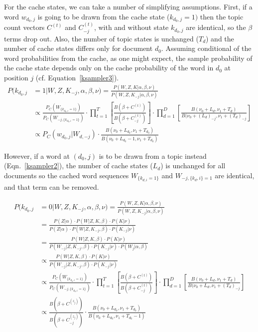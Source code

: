 For the cache states, we can take a number of simplifying assumptions.  First, if a word $w_{d_0,j}$ is going to be drawn from the cache state ($k_{d_0,j}=1)$ then the topic count vectors $C^{(t)}$ and $C^{(t)}_{-j}$, with and without state $k_{d_0,j}$ are identical, so the $\beta$ terms drop out. Also, the number of topic states is unchanged ($T_d$) and the number of cache states differs only for document $d_0$.   Assuming conditional of the word probabilities from the cache, as one might expect, the sample probability of the cache state depends only on the cache probability of the word in $d_0$ at position $j$ (cf. Equation~\ref{ksampler3}).
\begin{align}
P(k_{d_0,j}&=1|W,Z,K_{-j},\alpha,\beta,\nu) = \frac{P(W,Z,K|\alpha,\beta,\nu)}{P(W,Z,K_{-j}|\alpha,\beta,\nu)} \\
&\propto \frac{P_C(W_{\{k_{d_0,i}=1\}})}{P_C(W_{-j,\{k_{d_0,i}=1\}}) } \cdot \prod_{t=1}^T \left [ \frac{B(\beta + C^{(t)})}{B(\beta + C^{(t)}_{-j}) } \right ] \cdot \prod_{d=1}^{D} \left [ \frac{B(\nu_0+L_d,\nu_1+T_d)}{B(\nu_0+(L_d)_{-j},\nu_1+ (T_d)_{-j}} \right ]  \\
&\propto P_C(w_{d_0,j}|W_{d,-j})\cdot \frac{B(\nu_0+L_{d_0},\nu_1+T_{d_0})}{B(\nu_0+L_{d_0} - 1,\nu_1+T_{d_0})}  \label{ksampler3}
\end{align}

However, if a word at ${(d_0,j)}$ is to be drawn from a topic instead (Eqn.~\ref{ksampler2}), the number of cache states ($L_d$) is unchanged for all documents so the cached word sequences $W_{\{k_{d,i}=1\}}$ and $W_{-j,\{k_d,i\}=1}$ are identical, and that term can be removed.  

\begin{align}
P(k_{d_0,j}&=0|W,Z,K_{-j},\alpha,\beta,\nu) = \frac{P(W,Z,K|\alpha,\beta,\nu)}{P(W,Z,K_{-j}|\alpha,\beta,\nu)} \label{ksampler2} \\
&= \frac{P(Z|\alpha) \cdot P(W|Z,K,\beta) \cdot P(K|\nu)}{P(Z|\alpha) \cdot P(W|Z,K_{-j},\beta) \cdot P(K_{-j}|\nu)}  \\
&= \frac{P(W|Z,K,\beta)\cdot P(K|\nu)}{P(W_{-j}|Z,K_{-j},\beta) \cdot P(K_{-j}|\nu) \cdot P(W_j|\alpha,\beta) } \\
&\propto \frac{P(W|Z,K,\beta)\cdot P(K|\nu)}{P(W_{-j}|Z,K_{-j},\beta) \cdot P(K_{-j}|\nu) } \label{ksamplerUnnorm2} \\
&\propto \frac{P_C(W_{\{k_{d_0,i}=1\}})}{P_C(W_{-j,\{k_{d_0,i}=1\}}) } \cdot \prod_{t=1}^T \left [ \frac{B(\beta + C^{(t)})}{B(\beta + C^{(t)}_{-j}) } \right ] \cdot \prod_{d=1}^{D} \left [ \frac{B(\nu_0+L_d,\nu_1+T_d)}{B(\nu_0+L_d,\nu_1+ (T_d)_{-j}} \right ]  \\
&\propto \frac{B(\beta + C^{(z_j)})}{B(\beta + C^{(z_j)}_{-j})} \cdot \frac{B(\nu_0+L_{d_0},\nu_1+T_{d_0})}{B(\nu_0+L_{d_0},\nu_1+T_{d_0} - 1)} 
\end{align}


